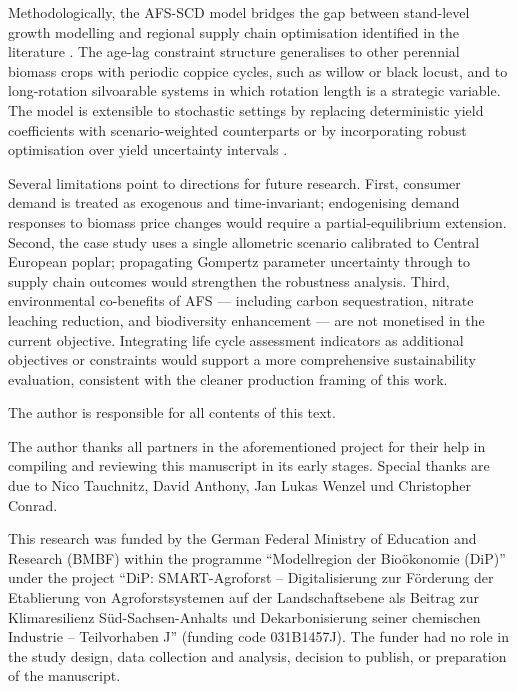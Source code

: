 \documentclass[APA,TimesLARGE]{WileyNJDv5} %
\begin{document}
Methodologically, the AFS-SCD model bridges the gap between stand-level
growth modelling and regional supply chain optimisation identified in
the literature \cite{Zahraee2020_BSC_review,Lamers2015_Feedstock_Design}.
The age-lag constraint structure generalises to other perennial biomass
crops with periodic coppice cycles, such as willow or black locust, and
to long-rotation silvoarable systems in which rotation length is a
strategic variable. The model is extensible to stochastic settings by
replacing deterministic yield coefficients with scenario-weighted
counterparts or by incorporating robust optimisation over yield
uncertainty intervals \cite{Sharma2013_BSC_review}.

Several limitations point to directions for future research. First,
consumer demand is treated as exogenous and time-invariant; endogenising
demand responses to biomass price changes would require a
partial-equilibrium extension. Second, the case study uses a single
allometric scenario calibrated to Central European poplar; propagating
Gompertz parameter uncertainty through to supply chain outcomes would
strengthen the robustness analysis. Third, environmental co-benefits of
AFS --- including carbon sequestration, nitrate leaching reduction, and
biodiversity enhancement --- are not monetised in the current objective.
Integrating life cycle assessment indicators as additional objectives
or constraints would support a more comprehensive sustainability
evaluation, consistent with the cleaner production framing of this work.


The author is responsible for all contents of this text.


The author thanks all partners in the aforementioned project for their help in compiling and reviewing this manuscript in its early stages. Special thanks are due to Nico Tauchnitz, David Anthony, Jan Lukas Wenzel und Christopher Conrad.


This research was funded by the German Federal Ministry of Education and Research (BMBF) within the programme ``Modellregion der Bioökonomie (DiP)'' under the project ``DiP: SMART-Agroforst -- Digitalisierung zur Förderung der Etablierung von Agroforstsystemen auf der Landschaftsebene als Beitrag zur Klimaresilienz Süd-Sachsen-Anhalts und Dekarbonisierung seiner chemischen Industrie -- Teilvorhaben J'' (funding code 031B1457J). The funder had no role in the study design, data collection and analysis, decision to publish, or preparation of the manuscript.
\end{document}
